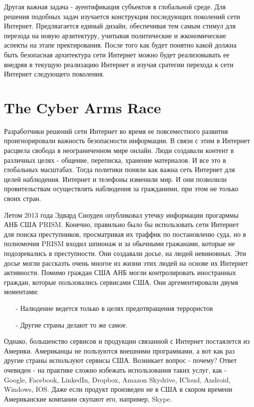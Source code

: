 \documentclass[11pt, a4paper]{article}		%
\begin{document}
Другая важная задача - ауентификация субъектов в глобальной среде. Для решения подобных задач изучается конструкция последующих поколений сети Интернет. Предляагается единый дизайн, обеспечивая тем самым стимул для перезода на новую арзитектуру, учитывая политические и жкономические аспекты на этапе пректирования. После того как будет понятно какой должна быть безопасная архитектура сети Интернет можно будет реализовывать ее внедряя в текущую реализацию Интернет и изучая сратегии перехода к сети Интернет следующего поколения.



\section{The Cyber Arms Race}

Разработчики решений сети Интернет во время ее повсеместного развития проигнорировали важность безопасности информации. В связи с этим в Интернет расцвела свобода в неограниченном мире онлайн. Люди создавали контент в различных целях - общение, переписка, хранение материалов. И все это в глобальных масштабах. Тогда политики поняли как важна сеть Интернет для целей наблюдения. Интернет и телефоны изменили мир. И они позволили провительствам осуществлять наблюдения за гражданими, при этом не только своих стран.

Летом 2013 года Эдвард Сноуден опубликовал утечку информации прогарммы АНБ США PRISM. Конечно, правильно было бы использовать сети Интернет для поиска преступников, просматривая их траффик по постановленю суда, но в полномочия PRISM входил шпионаж и за обычными гражанами, которые не подозревались в преступности. Они создавали досье, на людей невиновных. Эти досье могли рассказть очень многое из жизни этих людей на основе их Интернет активности. Помимо граждан США АНБ могли контролировать иностранных граждан, которые пользовались сервисами США. Они аргементировали двумя моментами: 

\begin{itemize}

\item[-] Налюдение ведется только в целях предотвращения террористов

\item[-] Другие страны делают то же самое.

\end{itemize} 

Однако, большенство сервисов и продукции связанной с Интернет постаялется из Америки. Американцы не пользуются внешними программами, а вот как раз другие страны используют сервисы США. Возникает вопрос - почему? Ответ очевиден - на практике сложно избежать использования таких услуг, как - Google, Facebook, LinkedIn, Dropbox, Amazon Skydrive, ICloud, Android, Windows, IOS. Даже если продукт произведен не в США в скором времени Американские компании скупают его, например, Skype.
\end{document}
